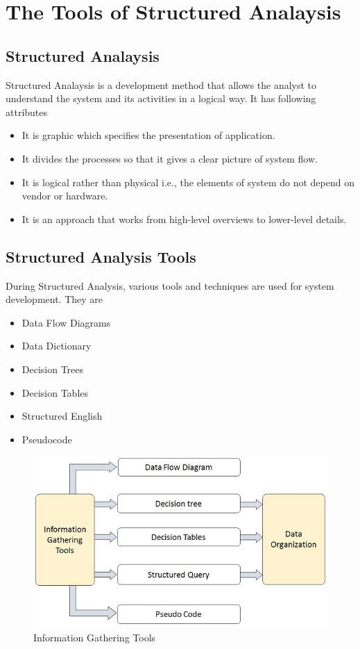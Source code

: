 \documentclass[a4paper,12pt]{report}
\begin{document}
\chapter{The Tools of Structured Analaysis}
\section{Structured Analaysis}
Structured Analaysis is a development method that allows the analyst to understand the system and its activities in a logical way.
It has following attributes 
\begin{itemize}
		\item	It is graphic which specifies the presentation of application. 
		\item	It divides the processes so that it gives a clear picture of system flow.  
		\item	It is logical rather than physical i.e., the elements of system do not depend on vendor or hardware.  
		\item	It is an approach that works from high-level overviews to lower-level details.
\end{itemize}
\section{Structured Analysis Tools}
During Structured Analysis, various tools and techniques are used for system development. They are \\
\begin{itemize}
	\item   Data Flow Diagrams
	\item	Data Dictionary
	\item	Decision Trees
	\item	Decision Tables
	\item	Structured English
	\item	Pseudocode
\end{itemize}
\begin{figure}[h]
	\centering
	\includegraphics[width=0.7\linewidth]{6_fig1}
	\caption{Information Gathering Tools}
	\label{fig:6fig1}
\end{figure}
\end{document}
